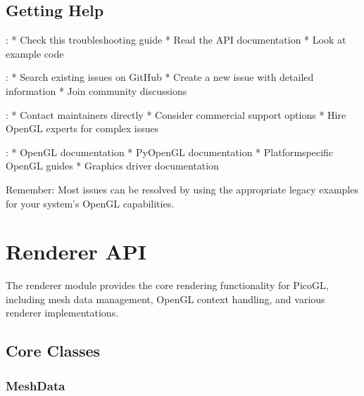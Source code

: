 \documentclass[a4paper,10pt,english,openany,oneside]{sphinxmanual}
\begin{document}
\subsection{Getting Help}
\label{\detokenize{troubleshooting:getting-help}}
\sphinxAtStartPar
{}:
* Check this troubleshooting guide
* Read the API documentation
* Look at example code

\sphinxAtStartPar
{}:
* Search existing issues on GitHub
* Create a new issue with detailed information
* Join community discussions

\sphinxAtStartPar
{}:
* Contact maintainers directly
* Consider commercial support options
* Hire OpenGL experts for complex issues

\sphinxAtStartPar
{}:
* OpenGL documentation
* PyOpenGL documentation
* Platform\sphinxhyphen{}specific OpenGL guides
* Graphics driver documentation

\sphinxAtStartPar
Remember: Most issues can be resolved by using the appropriate legacy examples for your system’s OpenGL capabilities.

\sphinxstepscope


\section{Renderer API}
\label{\detokenize{api/renderer:renderer-api}}\label{\detokenize{api/renderer::doc}}
\sphinxAtStartPar
The renderer module provides the core rendering functionality for PicoGL, including mesh data management, OpenGL context handling, and various renderer implementations.


\subsection{Core Classes}
\label{\detokenize{api/renderer:core-classes}}

\subsubsection{MeshData}
\label{\detokenize{api/renderer:meshdata}}
\end{document}
